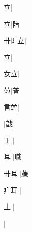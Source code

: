 \begin{multicols}{2}
{{立}\mktsJzrVerticalBar{}{\cjk{}{\cnsym{}　}{\cnsym{}　}{\cnsym{}　}}|{}\par
{立}\mktsJzrVerticalBar{}{\cjk{}{\cnsym{}　}{\cnsym{}　}{\cnsym{}　}}|{\cjk{}隌}\par
{\cjk{}卄{阝}立}\mktsJzrVerticalBar{}{\cjk{}{\cnsym{}　}{\cnsym{}　}{\cnsym{}　}}|{}\par
{立}\mktsJzrVerticalBar{}{\cjk{}{\cnsym{}　}{\cnsym{}　}{\cnsym{}　}}|{}\par
{\cjk{}{\cnsym{}　}女立}\mktsJzrVerticalBar{}{\cjk{}{\cnsym{}　}{\cnsym{}　}{\cnsym{}　}}|{}\par
{\cjk{}{\cnsym{}　}{\cnsym{}　}竝}\mktsJzrVerticalBar{}{\cjk{}{\cnsym{}　}{\cnsym{}　}{\cnsym{}　}}|{\cjk{}暜}\par
{\cjk{}{\cnsym{}　}言竝}\mktsJzrVerticalBar{}{\cjk{}{\cnsym{}　}{\cnsym{}　}{\cnsym{}　}}|{}\par
{}\mktsJzrVerticalBar{}{\cjk{}{\cnsym{}　}{\cnsym{}　}{\cnsym{}　}}|{\cjk{}戠}\par
{\cjk{}{\cnsym{}　}王{\cnjzr{}}}\mktsJzrVerticalBar{}{\cjk{}{\cnsym{}　}{\cnsym{}　}{\cnsym{}　}}|{}\par
{\cjk{}{\cnsym{}　}耳{\cnjzr{}}}\mktsJzrVerticalBar{}{\cjk{}{\cnsym{}　}{\cnsym{}　}{\cnsym{}　}}|{\cjk{}職}\par
{\cjk{}卄耳{\cnjzr{}}}\mktsJzrVerticalBar{}{\cjk{}{\cnsym{}　}{\cnsym{}　}{\cnsym{}　}}|{\cjk{}蘵}\par
{\cjk{}疒耳{\cnjzr{}}}\mktsJzrVerticalBar{}{\cjk{}{\cnsym{}　}{\cnsym{}　}{\cnsym{}　}}|{}\par
{\cjk{}{\cnsym{}　}土{\cnjzr{}}}\mktsJzrVerticalBar{}{\cjk{}{\cnsym{}　}{\cnsym{}　}{\cnsym{}　}}|{}\par
{}\mktsJzrVerticalBar{}{\cjk{}{\cnsym{}　}{\cnsym{}　}{\cnsym{}　}}|{}\par
}
\end{multicols}
